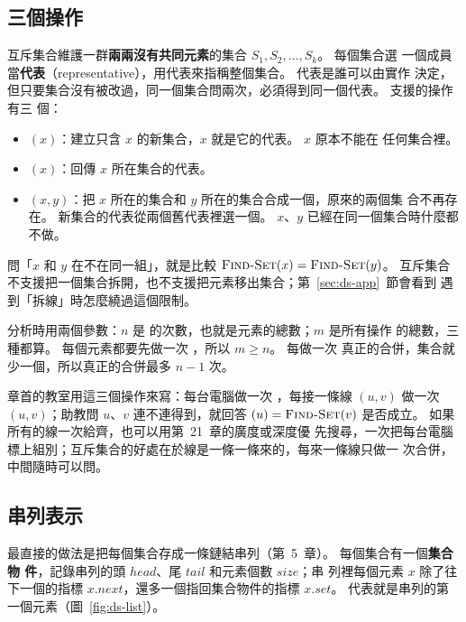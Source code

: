 \subsection{三個操作}

互斥集合維護一群\textbf{兩兩沒有共同元素}的集合 $S_1, S_2, \ldots, S_k$。 每個集合選
一個成員當\textbf{代表}（representative），用代表來指稱整個集合。 代表是誰可以由實作
決定，但只要集合沒有被改過，同一個集合問兩次，必須得到同一個代表。 支援的操作有三
個：

\begin{itemize}
\item {}$(x)$：建立只含 $x$ 的新集合，$x$ 就是它的代表。 $x$ 原本不能在
任何集合裡。
\item {}$(x)$：回傳 $x$ 所在集合的代表。
\item {}$(x, y)$：把 $x$ 所在的集合和 $y$ 所在的集合合成一個，原來的兩個集
合不再存在。 新集合的代表從兩個舊代表裡選一個。 $x$、$y$ 已經在同一個集合時什麼都
不做。
\end{itemize}

問「$x$ 和 $y$ 在不在同一組」，就是比較 $\proc{Find-Set}(x) = \proc{Find-Set}(y)$。
互斥集合不支援把一個集合拆開，也不支援把元素移出集合；第~\ref{sec:ds-app}~節會看到
遇到「拆線」時怎麼繞過這個限制。

分析時用兩個參數：$n$ 是  的次數，也就是元素的總數；$m$ 是所有操作
的總數，三種都算。 每個元素都要先做一次 ，所以 $m \ge n$。 每做一次
真正的合併，集合就少一個，所以真正的合併最多 $n - 1$ 次。

章首的教室用這三個操作來寫：每台電腦做一次 ，每接一條線 $(u, v)$ 做一次
$(u, v)$；助教問 $u$、$v$ 連不連得到，就回答 $(u) =
\proc{Find-Set}(v)$ 是否成立。 如果所有的線一次給齊，也可以用第~21~章的廣度或深度優
先搜尋，一次把每台電腦標上組別；互斥集合的好處在於線是一條一條來的，每來一條線只做一
次合併，中間隨時可以問。

\subsection{串列表示}

最直接的做法是把每個集合存成一條鏈結串列（第~5~章）。 每個集合有一個\textbf{集合物
件}，記錄串列的頭 $\mathit{head}$、尾 $\mathit{tail}$ 和元素個數 $\mathit{size}$；串
列裡每個元素 $x$ 除了往下一個的指標 $x.\mathit{next}$，還多一個指回集合物件的指標
$x.\mathit{set}$。 代表就是串列的第一個元素（圖~\ref{fig:ds-list}）。

